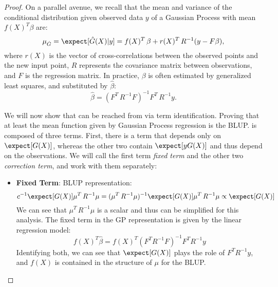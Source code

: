 \begin{proof}
    {\color{niceBlue}

    On a parallel avenue, we recall that the mean and variance of the conditional distribution given observed data $y$ of a Gaussian Process with mean $f(X)^T\beta$ are:
    \begin{equation}
        \mu_{\hat{G}}=\expect[\hat{G}(X)|y] = f(X)^T\,\beta + r(X)^T\,R^{-1}(y-F\beta),
        \label{eq:mean_gp_app}
    \end{equation}    
    where $r(X)$ is the vector of cross-correlations between the observed points and the new input point, $R$ represents the covariance matrix between observations, and $F$ is the regression matrix. In practice, $\beta$ is often estimated by generalized least squares, and substituted by $\hat{\beta}$: 
    \begin{equation*}
        \hat{\beta}=(F^T\,R^{-1}F)^{-1}F^T\,R^{-1}y.
    \end{equation*}
    }

    We will now show that \textcolor{niceBlue}{} can be reached from  via term identification. Proving that at least the mean function given by Gaussian Process regression is the BLUP.  is composed of three terms. First, there is a term that depends only on $\expect[G(X)]$, whereas the other two contain $\expect[yG(X)]$ and thus depend on the observations. We will call the first term \emph{fixed term} and the other two \emph{correction term}, and work with them separately:
    \begin{itemize}
        \item \textbf{Fixed Term}: BLUP representation: 
        \begin{equation*}
            c^{-1}\expect[G(X)]\mu^T\,R^{-1}\mu = (\mu^T\,R^{-1}\mu)^{-1}\expect[G(X)]\mu^T\,R^{-1}\mu \propto \expect[G(X)]
        \end{equation*}
        We can see that $\mu^T\,R^{-1}\mu$ is a scalar and thus can be simplified for this analysis.
        {\color{niceBlue}
        The fixed term in the GP representation is given by the linear regression model:
        \begin{equation*}
            f(X)^T\hat{\beta} = f(X)^T(F^TR^{-1}F)^{-1}F^TR^{-1}y
        \end{equation*}
        }
        Identifying both, we can see that $\expect[G(X)]$ plays the role of {\color{niceBlue} $F^TR^{-1}y$}, and {\color{niceBlue} $f(X)$} is contained in the structure of $\mu$ for the BLUP.


\end{itemize}
\end{proof}
